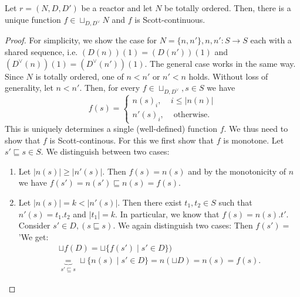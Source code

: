 \begin{lem}
    Let $r = (N,D,D')$ be a reactor and let $N$ be totally ordered.
    Then, there is a unique function $f \in \sqcup_{D,D^\vee} N$ and $f$ is Scott-continuous.
    \begin{proof}
        For simplicity, we show the case for $ N = \{n, n' \}, n, n': S \rightarrow S$ each with a shared sequence, i.e. $(D(n))(1) = (D(n'))(1)$ and $(D^\vee(n))(1) = (D^\vee(n'))(1)$.
        The general case works in the same way.
        Since $N$ is totally ordered, one of $n < n'$ or $n' < n$ holds. Without loss of generality, let $n < n'$.
        Then, for every $f \in \sqcup_{D,D^\vee}, s \in S$ we have \[ f(s) = \left\{
            \begin{array}{ll}
                n(s)_i, & i \leq |n(n)| \\
                n'(s)_i, & \text{ otherwise.}
            \end{array} 
        \right. \] 
        This is uniquely determines a single (well-defined) function $f$.
        We thus need to show that $f$ is Scott-continous.
        For this we first show that $f$ is monotone.
        Let $s' \sqsubseteq s \in S$. 
        We distinguish between two cases:
        \begin{enumerate}
        \item Let $|n(s)| \geq  |n'(s)|$. Then $f(s) = n(s)$ and by the monotonicity of $n$ we have $f(s') = n(s') \sqsubseteq n(s) = f(s).$
        \item Let $|n(s)| = k < |n'(s)|$. Then there exist $t_1,t_2 \in S$ such that $n'(s) = t_1.t_2$ and $|t_1| = k.$
        In particular, we know that $f(s) = n(s).t'$.
        Consider $s' \in D, (s \sqsubseteq s)$. We again distinguish two cases:
        Then $f(s') = $'We get: 
         \begin{align*}
             \sqcup f(D) = \sqcup \{ f(s') \mid s' \in D \})  \\ 
             \underbrace{=}_{s' \sqsubseteq s} \sqcup \{ n(s) \mid s' \in D\} = n(\sqcup D) = n(s) = f(s).
             \end{align*}

        \end{enumerate}


\end{proof}
\end{lem}
